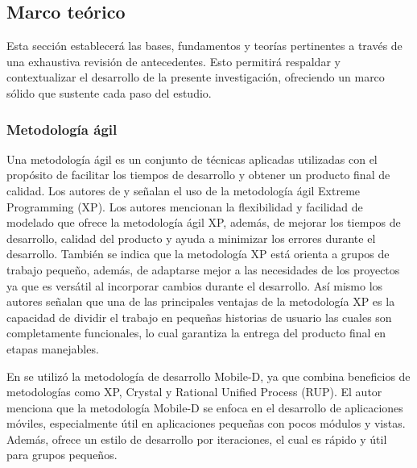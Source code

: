 \subsection{Marco teórico}
Esta sección establecerá las bases, fundamentos y teorías pertinentes a través de una exhaustiva revisión de
antecedentes. Esto permitirá respaldar y contextualizar el desarrollo de la presente investigación, ofreciendo
un marco sólido que sustente cada paso del estudio.

\subsubsection{Metodología ágil}
Una metodología ágil es un conjunto de técnicas aplicadas utilizadas con el propósito de facilitar los tiempos de
desarrollo y obtener un producto final de calidad. Los autores de \cite{lesanoperezAplicativoMovilGeoubicacion2022} y
\cite{chicaizavillegasAplicacionWebPara2023}
señalan el uso de la
metodología ágil Extreme Programming (XP). Los autores
mencionan la flexibilidad y facilidad de modelado que ofrece la metodología ágil XP, además, de mejorar los tiempos
de desarrollo, calidad del producto y ayuda a minimizar los errores durante el desarrollo. También
se indica que la metodología XP está orienta a grupos de
trabajo pequeño, además, de adaptarse mejor a las necesidades de los proyectos ya que es versátil al incorporar
cambios durante el desarrollo. Así mismo los autores señalan que una de las
principales ventajas de la metodología XP es la capacidad de dividir el trabajo en pequeñas historias de usuario
las cuales son completamente funcionales, lo cual garantiza la entrega
del producto final en etapas manejables.

\bigbreak
En \cite{chasichangoAplicacionMovilApoyo2022} se utilizó la metodología de desarrollo Mobile-D, ya que combina
beneficios de metodologías como XP, Crystal y Rational Unified Process (RUP). El autor menciona que la metodología Mobile-D se enfoca en el
desarrollo de aplicaciones móviles, especialmente útil en aplicaciones pequeñas con pocos módulos y vistas. Además,
ofrece un estilo de desarrollo por iteraciones, el cual es rápido y útil para grupos pequeños.

